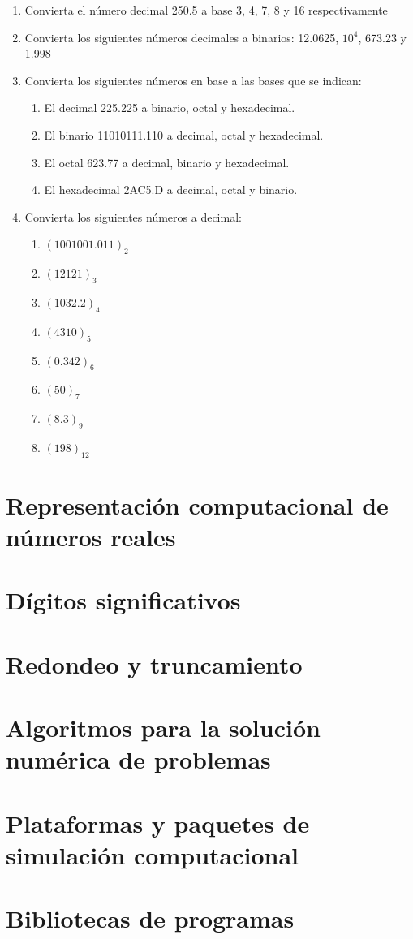 \begin{enumerate}
  \item Convierta el número decimal 250.5 a base 3, 4, 7, 8 y 16 respectivamente
  \item Convierta los siguientes números decimales a binarios: 12.0625, $10^{4}$, 673.23 y 1.998
  \item Convierta los siguientes números en base a las bases que se indican:
    \begin{enumerate}
      \item El decimal 225.225 a binario, octal y hexadecimal.
      \item El binario 11010111.110 a decimal, octal y hexadecimal.
      \item El octal 623.77 a decimal, binario y hexadecimal.
      \item El hexadecimal 2AC5.D a decimal, octal y binario.
    \end{enumerate}
    
  \item Convierta los siguientes números a decimal:
    \begin{enumerate}
      \item $(1001001.011)_{2}$
      \item $(12121)_{3}$
      \item $(1032.2)_{4}$
      \item $(4310)_{5}$
      \item $(0.342)_{6}$
      \item $(50)_{7}$
      \item $(8.3)_{9}$
      \item $(198)_{12}$
    \end{enumerate}
\end{enumerate}
  
  

\section{Representación computacional de números reales}

\section{Dígitos significativos}

\section{Redondeo y truncamiento}

\section{Algoritmos para la solución numérica de problemas}

\section{Plataformas y paquetes de simulación computacional}

\section{Bibliotecas de programas}